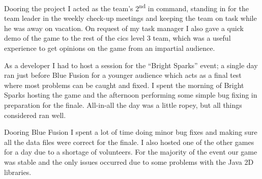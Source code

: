 \documentclass[a4paper,11pt]{report}
\begin{document}
Dooring the project I acted as the team's 2\textsuperscript{nd} in command, standing in for the team
leader in the weekly check-up meetings and keeping the team on task while he was away on vacation.
On request of my task manager I also gave a quick demo of the game to the rest of the \gls{cics}
level 3 team, which was a useful experience to get opinions on the game from an impartial audience.

As a developer I had to host a session for the ``Bright Sparks'' event; a single day ran just
before Blue Fusion for a younger audience which acts as a final test where most problems can be
caught and fixed. I spent the morning of Bright Sparks hosting the game and the afternoon 
performing some simple bug fixing in preparation for the finale. All-in-all the day was a little
ropey, but all things considered ran well.

Dooring Blue Fusion I spent a lot of time doing minor bug fixes and making sure all the data files 
were correct for the finale. I also hosted one of the other games for a day due to a shortage of
volunteers. For the majority of the event our game was stable and the only issues occurred due to
some problems with the Java 2D libraries.
\end{document}
